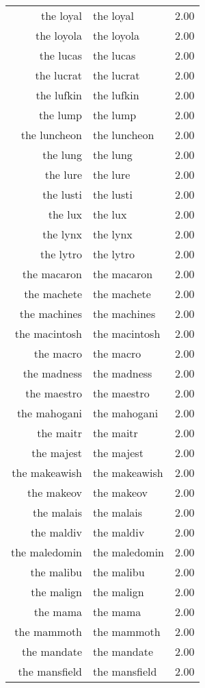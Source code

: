 \begin{table}[ht]
\begin{tabular}{rlr}
  the loyal & the loyal & 2.00 \\ 
  the loyola & the loyola & 2.00 \\ 
  the lucas & the lucas & 2.00 \\ 
  the lucrat & the lucrat & 2.00 \\ 
  the lufkin & the lufkin & 2.00 \\ 
  the lump & the lump & 2.00 \\ 
  the luncheon & the luncheon & 2.00 \\ 
  the lung & the lung & 2.00 \\ 
  the lure & the lure & 2.00 \\ 
  the lusti & the lusti & 2.00 \\ 
  the lux & the lux & 2.00 \\ 
  the lynx & the lynx & 2.00 \\ 
  the lytro & the lytro & 2.00 \\ 
  the macaron & the macaron & 2.00 \\ 
  the machete & the machete & 2.00 \\ 
  the machines & the machines & 2.00 \\ 
  the macintosh & the macintosh & 2.00 \\ 
  the macro & the macro & 2.00 \\ 
  the madness & the madness & 2.00 \\ 
  the maestro & the maestro & 2.00 \\ 
  the mahogani & the mahogani & 2.00 \\ 
  the maitr & the maitr & 2.00 \\ 
  the majest & the majest & 2.00 \\ 
  the makeawish & the makeawish & 2.00 \\ 
  the makeov & the makeov & 2.00 \\ 
  the malais & the malais & 2.00 \\ 
  the maldiv & the maldiv & 2.00 \\ 
  the maledomin & the maledomin & 2.00 \\ 
  the malibu & the malibu & 2.00 \\ 
  the malign & the malign & 2.00 \\ 
  the mama & the mama & 2.00 \\ 
  the mammoth & the mammoth & 2.00 \\ 
  the mandate & the mandate & 2.00 \\ 
  the mansfield & the mansfield & 2.00 \\ 

\end{tabular}
\end{table}

